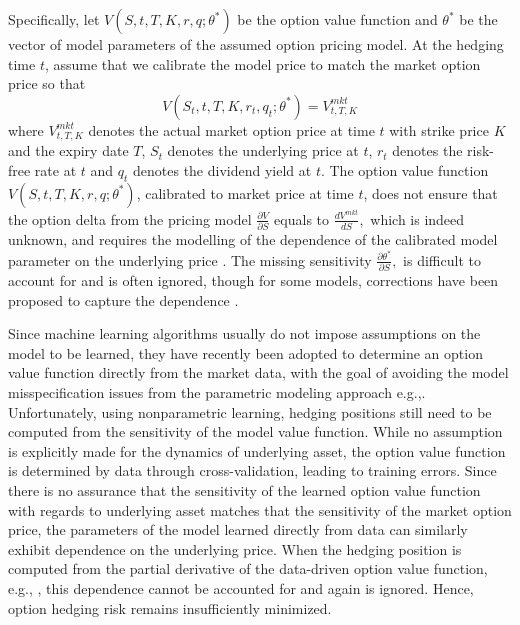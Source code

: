 \documentclass[letterpaper,12pt,titlepage,oneside,final]{book}
\numberwithin{equation}{section}
\theoremstyle{definition}
\newcommand{\Vmkt}{V^{mkt}}
\begin{document}
Specifically, let $V(S,t,T,K,r,q;\theta^*)$ be  the option value function and $\theta^*$ be the vector of model parameters of the assumed option pricing model. At the hedging time $t$, assume that we  calibrate the model price to match the market option price so that
\begin{equation} \label{eq:imp}
V(S_t,t,T,K,r_t,q_t; \theta^*)=V^{mkt}_{t,T,K}
\end{equation}
where $\Vmkt_{t,T,K}$ denotes the actual market option price at time $t$  with  strike price  $K$ and the expiry date  $T$, $S_t$ denotes the underlying price at $t$, $r_t$ denotes the risk-free rate at $t$ and $q_t$ denotes the dividend yield at $t$.
The option value function $V(S,t,T,K,r,q; \theta^*)$, calibrated to market price at time $t$,  does not ensure that the option delta from the pricing model $\frac{\partial V}{\partial S}$
equals to
$
\frac{d \Vmkt}{d S},
$
which is indeed unknown, and requires the modelling  of the dependence of the calibrated model parameter on the underlying price \citep{knian2017,coleman2001,hulloptimal}. The missing sensitivity $
\frac{\partial \theta^*}{\partial S},
$ is difficult to account for and is often ignored, though
for some models, corrections have been proposed to capture the dependence \citep{hulloptimal,hagan2017bartlett,bartlett2006hedging}.


Since machine learning algorithms usually do not impose assumptions on the model to be learned, they have recently been adopted to determine an option value function directly from the market data, with the goal of avoiding the model misspecification issues from the parametric modeling approach e.g.,\citep{gradojevic2009option,garcia2000pricing,hutchinson}.
Unfortunately, using nonparametric learning, hedging positions still need to be computed from the sensitivity of the model value function.
While no assumption is explicitly made for the  dynamics of underlying asset, the option value function is determined by data through cross-validation, leading to training errors.
Since there is no assurance that the  sensitivity of the learned option value function  with regards to underlying asset matches that the sensitivity of the market option price,
the parameters of the model learned directly from data can similarly exhibit dependence on the underlying price. When the hedging position is computed from the partial derivative of the data-driven option value function, e.g.,  \citep{hutchinson}, this dependence cannot be accounted for and again is ignored. Hence, option hedging risk remains insufficiently minimized.
\end{document}
